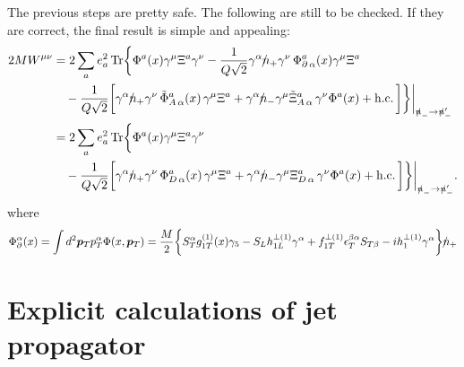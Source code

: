 \documentclass[preprintnumbers,floatfix,nofootinbib]{revtex4}
\newcommand{\nslash}{n \hspace{-0.24cm} / \,}
\newcommand{\Tr}{\operatorname*{Tr}\nolimits} %
\begin{document}
The previous steps are pretty safe. The following are still to be checked. If
they are correct, the final result is simple and appealing:
\begin{equation}
\begin{split} 
2M W^{\mu\nu} 
&= 2 \sum_a   e_a^2  
\Tr \biggl\{  \Phi^a (x) \gamma^\mu \Xi^a \gamma^\nu
-  \frac{1}{Q\sqrt{2}}
  \gamma^\alpha \nslash_+ \gamma^\nu \,
\Phi_{\partial\,\alpha}^a (x) \gamma^\mu \Xi^{a} 
\\
& \quad 
- \frac{1}{Q\sqrt{2}} \biggl[
  \gamma^\alpha \nslash_+ \gamma^\nu \,
  \tilde{\Phi}^a_{A\, \alpha}(x)\, \gamma^\mu 
\Xi^a
+ \gamma^\alpha \nslash_- \gamma^\mu
  \tilde{\Xi}^a_{A\, \alpha} \, \gamma^\nu 
  \Phi^a (x)  
  + \mathrm{h.c.} \,\biggr] \biggr\}\biggr\vert_{\slashed{n}_- \to \slashed{n}_-'}
\\
&= 2 \sum_a   e_a^2  
\Tr \biggl\{  \Phi^a (x) \gamma^\mu \Xi^a  \gamma^\nu
\\
& \quad 
- \frac{1}{Q\sqrt{2}} \biggl[
  \gamma^\alpha \nslash_+ \gamma^\nu \,
  \Phi^a_{D\, \alpha}(x)\, \gamma^\mu 
\Xi^a
+ \gamma^\alpha \nslash_- \gamma^\mu
  \Xi^a_{D\, \alpha} \, \gamma^\nu 
  \Phi^a (x)  
  + \mathrm{h.c.} \,\biggr] \biggr\}\biggr\vert_{\slashed{n}_- \to \slashed{n}_-'}
.
\label{eq4}
\end{split} 
\end{equation} 
where
\begin{equation}
 \Phi_{\partial}^{\alpha} (x) = \int d^2\bm{p}_T p_T^{\alpha} \Phi(x,\bm{p}_T)
= \frac{M}{2}\biggl\{ S_T^{\alpha} g_{1T}^{(1)}(x) \gamma_5
- S_L h_{1L}^{\perp (1)} \gamma^{\alpha} 
+ f_{1T}^{\perp (1)} \epsilon_T^{\beta \alpha} S_{T \beta}
- i h_{1}^{\perp (1)}\gamma^{\alpha}\biggr\}\nslash_+ 
\end{equation} 

\section{Explicit calculations of jet propagator}
\end{document}
